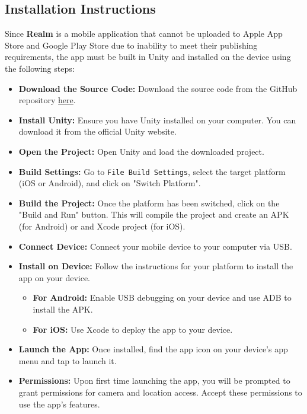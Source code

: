 \documentclass[12pt, titlepage]{article}
\newcommand{\progname}{Realm}
\begin{document}
\subsection{Installation Instructions}
Since \textbf{\progname} is a mobile application that cannot be uploaded to Apple App Store and Google Play Store due to inability to meet their publishing requirements, the app must be built in Unity and installed on the device using the following steps:
\begin{itemize}[leftmargin=*]
    \item \textbf{Download the Source Code:} Download the source code from the GitHub repository \href{https://github.com/russellrd/realm}{here}.
    \item \textbf{Install Unity:} Ensure you have Unity installed on your computer. You can download it from the official Unity website.
    \item \textbf{Open the Project:} Open Unity and load the downloaded project.
    \item \textbf{Build Settings:} Go to \texttt{File \> Build Settings}, select the target platform (iOS or Android), and click on "Switch Platform".
    \item \textbf{Build the Project:} Once the platform has been switched, click on the "Build and Run" button. This will compile the project and create an APK (for Android) or and Xcode project (for iOS).
    \item \textbf{Connect Device:} Connect your mobile device to your computer via USB.
    \item \textbf{Install on Device:} Follow the instructions for your platform to install the app on your device.
          \begin{itemize}[leftmargin=*]
              \item \textbf{For Android:} Enable USB debugging on your device and use ADB to install the APK.
              \item \textbf{For iOS:} Use Xcode to deploy the app to your device.
          \end{itemize}
    \item \textbf{Launch the App:} Once installed, find the app icon on your device's app menu and tap to launch it.
    \item \textbf{Permissions:} Upon first time launching the app, you will be prompted to grant permissions for camera and location access. Accept these permissions to use the app's features.
\end{itemize}
\end{document}
